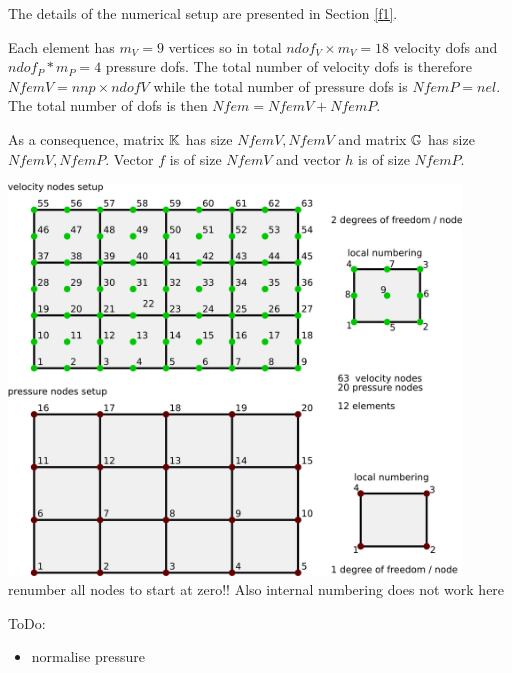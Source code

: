 The details of the numerical setup are presented in Section \ref{f1}.

Each element has $m_V=9$ vertices so in total $ndof_V\times m_V=18$ velocity dofs and 
$ndof_P*m_P=4$ pressure dofs. The total number of 
velocity dofs is therefore $NfemV=nnp \times ndofV$ while the total number of
pressure dofs is $NfemP=nel$. The total number of dofs is then $Nfem=NfemV+NfemP$.

As a consequence, matrix ${\mathbb{K}}$ has size $NfemV,NfemV$ and matrix ${\mathbb{G}}$ has size $NfemV,NfemP$.
Vector $f$ is of size $NfemV$ and vector $h$ is of size $NfemP$.  

\begin{center}
\includegraphics[width=12cm]{python_codes/fieldstone_saddlepoint_q2q1/q2q1setup}\\
{\color{red} renumber all nodes to start at zero!! Also internal numbering does not work here }
\end{center}


ToDo:
\begin{itemize}
\item normalise pressure 
\end{itemize}


